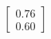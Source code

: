 \documentclass[preview]{standalone}
\begin{document}
\begin{align*}
\begin{bmatrix} 0.76 \\ 0.60 \end{bmatrix}
\end{align*}
\end{document}
